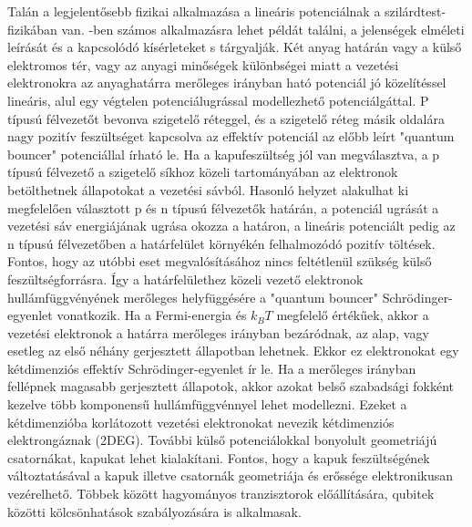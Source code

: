 Talán a legjelentősebb fizikai alkalmazása a lineáris potenciálnak a szilárdtest-fizikában van. \cite{Beenakker_1991}-ben számos alkalmazásra lehet példát találni, a jelenségek elméleti leírását és a kapcsolódó kísérleteket s tárgyalják. Két anyag határán vagy a külső elektromos tér, vagy az anyagi minőségek különbségei miatt a vezetési elektronokra az anyaghatárra merőleges irányban ható potenciál jó közelítéssel lineáris, alul egy végtelen potenciálugrással modellezhető potenciálgáttal. P típusú félvezetőt bevonva szigetelő réteggel, és a szigetelő réteg másik oldalára nagy pozitív feszültséget kapcsolva az effektív potenciál az előbb leírt "quantum bouncer" potenciállal írható le. Ha a kapufeszültség jól van megválasztva, a p típusú félvezető a szigetelő síkhoz közeli tartományában az elektronok betölthetnek állapotokat a vezetési sávból. Hasonló helyzet alakulhat ki megfelelően választott p és n típusú félvezetők határán, a potenciál ugrását a vezetési sáv energiájának ugrása okozza a határon, a lineáris potenciált pedig az n típusú félvezetőben a határfelület környékén felhalmozódó pozitív töltések. Fontos, hogy az utóbbi eset megvalósításához nincs feltétlenül szükség külső feszültségforrásra. Így a határfelülethez közeli vezető elektronok hullámfüggvényének merőleges helyfüggésére a "quantum bouncer" Schrödinger-egyenlet vonatkozik. Ha a Fermi-energia és $k_BT$ megfelelő értékűek, akkor a vezetési elektronok a határra merőleges irányban bezáródnak, az alap, vagy esetleg az első néhány gerjesztett állapotban lehetnek. Ekkor ez elektronokat egy kétdimenziós effektív Schrödinger-egyenlet ír le. Ha a merőleges irányban fellépnek magasabb gerjesztett állapotok, akkor azokat belső szabadsági fokként kezelve több komponensű hullámfüggvénnyel lehet modellezni. Ezeket a kétdimenzióba korlátozott vezetési elektronokat nevezik kétdimenziós elektrongáznak (2DEG). További külső potenciálokkal bonyolult geometriájú csatornákat, kapukat lehet kialakítani. Fontos, hogy a kapuk feszültségének változtatásával a kapuk illetve csatornák geometriája és erőssége elektronikusan vezérelhető. Többek között hagyományos tranzisztorok előállítására, qubitek közötti kölcsönhatások szabályozására is alkalmasak.

